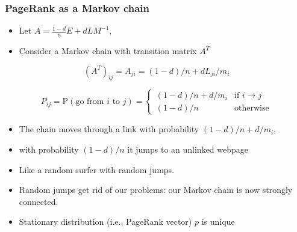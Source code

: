 \documentclass[mathserif]{beamer}
\def\P{\mathrm{P}}
\def\red{\color[rgb]{0.8,0,0}}
\begin{document}
\begin{frame}
\frametitle{PageRank as a Markov chain}
\begin{itemize}
\item Let $A=\frac{1-d}{n} E + d LM^{-1}$, 
\item Consider a Markov chain with {\red transition
matrix $A^T$} 
\end{itemize}


 $$(A^T)_{ij} = A_{ji} = (1-d)/n + d L_{ji}/m_i$$

$$P_{ij} = \P(\text{go from $i$ to $j$}) =
\begin{cases}
(1-d)/n + d/m_i & \text{if $i \rightarrow j$} \\
(1-d)/n & \text{otherwise}
\end{cases}
$$
\begin{itemize}
\item The chain moves through a link with 
probability $(1-d)/n + d/m_i$, 
\item  with probability 
$(1-d)/n$ it jumps to an unlinked webpage
\item Like a {\red random surfer} with 
{\red random jumps}.
\item Random jumps get rid of our 
problems: our Markov chain is now strongly
connected. 
\item Stationary distribution
(i.e., PageRank vector) $p$ is {\red unique}
\end{itemize}



\end{frame}
\end{document}

